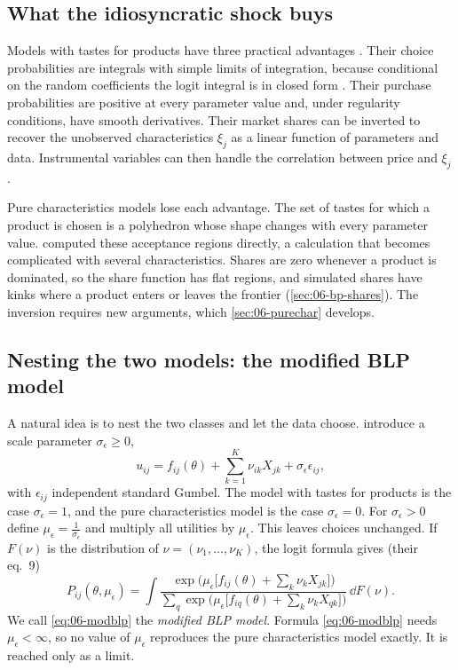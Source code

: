 \subsection{What the idiosyncratic shock buys}\label{sec:06-eps-advantages}

Models with tastes for products have three practical advantages \citep[pp.~7--8]{BerryPakes2007}. Their choice
probabilities are integrals with simple limits of integration, because conditional on the random coefficients the
logit integral is in closed form \citep{McFadden1981}. Their purchase probabilities are positive at every parameter
value and, under regularity conditions, have smooth derivatives. Their market shares can be inverted to recover the
unobserved characteristics $\xi_j$ as a linear function of parameters and data. Instrumental variables can then handle
the correlation between price and $\xi_j$ \citep{BerryLevinsohnPakes1995}.

Pure characteristics models lose each advantage. The set of tastes for which a product is chosen is a polyhedron whose
shape changes with every parameter value. \citet{FeenstraLevinsohn1995} computed these acceptance regions directly, a
calculation that becomes complicated with several characteristics. Shares are zero whenever a product is dominated,
so the share function has flat regions, and simulated shares have kinks where a product enters or leaves the frontier
(\cref{sec:06-bp-shares}). The inversion requires new arguments, which \cref{sec:06-purechar} develops.

\subsection{Nesting the two models: the modified BLP model}\label{sec:06-nesting}

A natural idea is to nest the two classes and let the data choose. \citet[eqs.~7--8]{BerryPakes2007} introduce a scale
parameter $\sigma_\epsilon \ge 0$,
\begin{equation}\label{eq:06-nest}
  u_{ij} = f_{ij}(\theta) + \sum_{k=1}^{K} \nu_{ik} X_{jk} + \sigma_\epsilon \epsilon_{ij},
\end{equation}
with $\epsilon_{ij}$ independent standard Gumbel. The model with tastes for products is the case $\sigma_\epsilon = 1$,
and the pure characteristics model is the case $\sigma_\epsilon = 0$. For $\sigma_\epsilon > 0$ define $\mu_\epsilon =
\frac{1}{\sigma_\epsilon}$ and multiply all utilities by $\mu_\epsilon$. This leaves choices unchanged. If $F(\nu)$ is the
distribution of $\nu = (\nu_1, \dots, \nu_K)$, the logit formula gives (their eq.~9)
\begin{equation}\label{eq:06-modblp}
  P_{ij}(\theta, \mu_\epsilon) = \int
  \frac{\exp\bigl(\mu_\epsilon\bigl[f_{ij}(\theta) + \sum_{k} \nu_k X_{jk}\bigr]\bigr)}
       {\sum_{q} \exp\bigl(\mu_\epsilon\bigl[f_{iq}(\theta) + \sum_{k} \nu_k X_{qk}\bigr]\bigr)} \,\dd F(\nu).
\end{equation}
We call \eqref{eq:06-modblp} the \emph{modified BLP model}. Formula \eqref{eq:06-modblp} needs $\mu_\epsilon < \infty$,
so no value of $\mu_\epsilon$ reproduces the pure characteristics model exactly. It is reached only as a limit.

